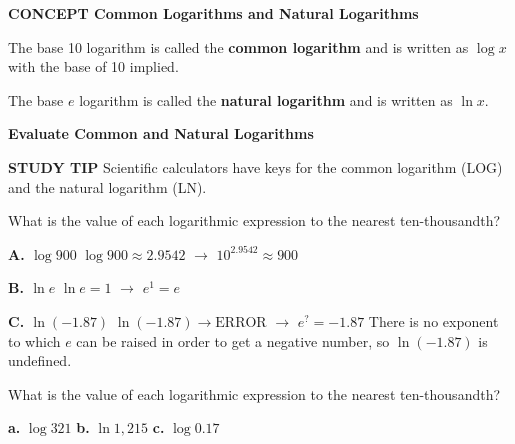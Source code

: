 \documentclass{article}
\newenvironment{concept-box}{}{}
\newenvironment{example}[1]{}{}
\newenvironment{tryit}[1]{}{}
\newcommand{\placeholder}[2]{}
\begin{document}
\begin{concept-box}
\textbf{CONCEPT Common Logarithms and Natural Logarithms}

The base 10 logarithm is called the \textbf{common logarithm} and is written as $\log x$ with the base of 10 implied.

The base $e$ logarithm is called the \textbf{natural logarithm} and is written as $\ln x$.
\end{concept-box}

\begin{example}{4}
\textbf{Evaluate Common and Natural Logarithms}

\textbf{STUDY TIP}
Scientific calculators have keys for the common logarithm (LOG) and the natural logarithm (LN).

What is the value of each logarithmic expression to the nearest ten-thousandth?

\placeholder{diagram}{Callout: Evaluate the exponential forms to reinforce these inverse operations.}

\textbf{A. $\log 900$}
$\log 900 \approx 2.9542$ $\rightarrow$ $10^{2.9542} \approx 900$

\textbf{B. $\ln e$}
$\ln e = 1$ $\rightarrow$ $e^1 = e$

\textbf{C. $\ln (-1.87)$}
$\ln (-1.87) \rightarrow \text{ERROR}$ $\rightarrow$ $e^? = -1.87$
There is no exponent to which $e$ can be raised in order to get a negative number, so $\ln (-1.87)$ is undefined.

\placeholder{illustration}{Calculator screen showing: \newline log(900) \newline 2.954242509 \newline ln(e) \newline 1 \newline ln(-1.87) \newline Error}
\end{example}

\begin{tryit}{4}
What is the value of each logarithmic expression to the nearest ten-thousandth?

\textbf{a.} $\log 321$ \qquad \textbf{b.} $\ln 1,215$ \qquad \textbf{c.} $\log 0.17$
\end{tryit}
\end{document}
